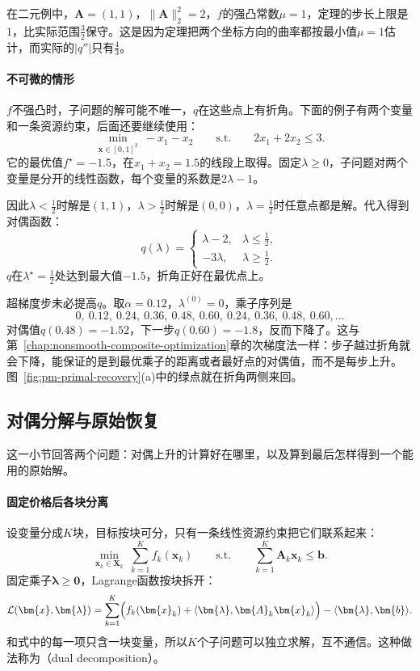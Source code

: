在二元例中，$\bm{A}=(1,1)$，$\lVert\bm{A}\rVert_2^2=2$，$f$的强凸常数$\mu=1$，定理的步长上限是$1$，比实际范围$\tfrac32$保守。这是因为定理把两个坐标方向的曲率都按最小值$\mu=1$估计，而实际的$\lvert q''\rvert$只有$\tfrac43$。

\paragraph{不可微的情形}
$f$不强凸时，子问题的解可能不唯一，$q$在这些点上有折角。下面的例子有两个变量和一条资源约束，后面还要继续使用：
\begin{equation}
 \min_{\bm{x}\in[0,1]^2}\ -x_1-x_2\qquad\text{s.t.}\qquad 2x_1+2x_2\leq3 .
 \label{eq:pm-lp-resource}
\end{equation}
它的最优值$f^\star=-1.5$，在$x_1+x_2=1.5$的线段上取得。固定$\lambda\geq0$，子问题对两个变量是分开的线性函数，每个变量的系数是$2\lambda-1$。

因此$\lambda<\tfrac12$时解是$(1,1)$，$\lambda>\tfrac12$时解是$(0,0)$，$\lambda=\tfrac12$时任意点都是解。代入得到对偶函数：
\[
 q(\lambda)=\begin{cases}\lambda-2,&\lambda\leq\tfrac12,\\-3\lambda,&\lambda\geq\tfrac12.\end{cases}
\]
$q$在$\lambda^\star=\tfrac12$处达到最大值$-1.5$，折角正好在最优点上。

超梯度步未必提高$q$。取$\alpha=0.12$，$\lambda^{(0)}=0$，乘子序列是
\[
 0,\ 0.12,\ 0.24,\ 0.36,\ 0.48,\ 0.60,\ 0.24,\ 0.36,\ 0.48,\ 0.60,\ldots
\]
对偶值$q(0.48)=-1.52$，下一步$q(0.60)=-1.8$，反而下降了。这与第~\ref{chap:nonsmooth-composite-optimization}章的次梯度法一样：步子越过折角就会下降，能保证的是到最优乘子的距离或者最好点的对偶值，而不是每步上升。图~\ref{fig:pm-primal-recovery}(a)中的绿点就在折角两侧来回。

\subsection{对偶分解与原始恢复}
\label{sec:pm-decomposition}

这一小节回答两个问题：对偶上升的计算好在哪里，以及算到最后怎样得到一个能用的原始解。

\paragraph{固定价格后各块分离}
设变量分成$K$块，目标按块可分，只有一条线性资源约束把它们联系起来：
\begin{equation}
 \min_{\bm{x}_k\in\bm{X}_k}\ \sum_{k=1}^Kf_k(\bm{x}_k)\qquad\text{s.t.}\qquad\sum_{k=1}^K\bm{A}_k\bm{x}_k\leq\bm{b}.
 \label{eq:pm-separable}
\end{equation}
固定乘子$\bm{\lambda}\geq\bm{0}$，Lagrange函数按块拆开：
\[
 \mathcal{L}(\bm{x},\bm{\lambda})=\sum_{k=1}^K\Bigl(f_k(\bm{x}_k)+\langle\bm{\lambda},\bm{A}_k\bm{x}_k\rangle\Bigr)-\langle\bm{\lambda},\bm{b}\rangle .
\]
和式中的每一项只含一块变量，所以$K$个子问题可以独立求解，互不通信。这种做法称为（dual decomposition）。

